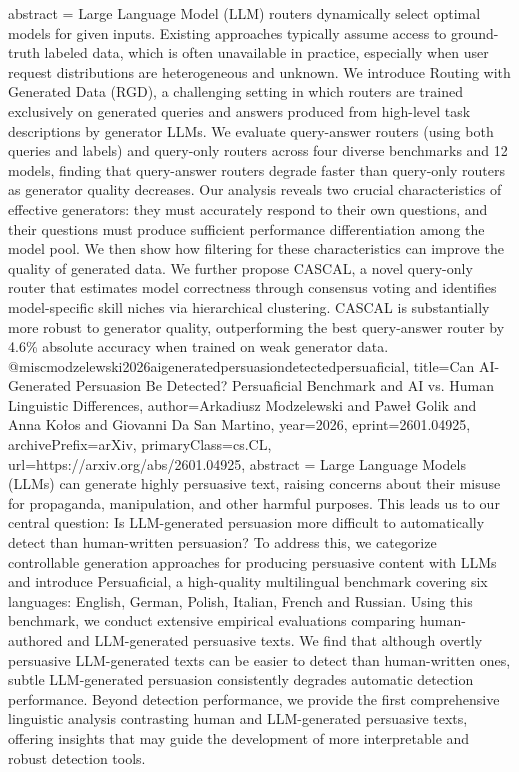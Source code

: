 {      abstract = {Large Language Model (LLM) routers dynamically select optimal models for given inputs. Existing approaches typically assume access to ground-truth labeled data, which is often unavailable in practice, especially when user request distributions are heterogeneous and unknown. We introduce Routing with Generated Data (RGD), a challenging setting in which routers are trained exclusively on generated queries and answers produced from high-level task descriptions by generator LLMs. We evaluate query-answer routers (using both queries and labels) and query-only routers across four diverse benchmarks and 12 models, finding that query-answer routers degrade faster than query-only routers as generator quality decreases. Our analysis reveals two crucial characteristics of effective generators: they must accurately respond to their own questions, and their questions must produce sufficient performance differentiation among the model pool. We then show how filtering for these characteristics can improve the quality of generated data. We further propose CASCAL, a novel query-only router that estimates model correctness through consensus voting and identifies model-specific skill niches via hierarchical clustering. CASCAL is substantially more robust to generator quality, outperforming the best query-answer router by 4.6\% absolute accuracy when trained on weak generator data.}
}@misc{modzelewski2026aigeneratedpersuasiondetectedpersuaficial,
      title={Can AI-Generated Persuasion Be Detected? Persuaficial Benchmark and AI vs. Human Linguistic Differences}, 
      author={Arkadiusz Modzelewski and Paweł Golik and Anna Kołos and Giovanni Da San Martino},
      year={2026},
      eprint={2601.04925},
      archivePrefix={arXiv},
      primaryClass={cs.CL},
      url={https://arxiv.org/abs/2601.04925},
      abstract = {Large Language Models (LLMs) can generate highly persuasive text, raising concerns about their misuse for propaganda, manipulation, and other harmful purposes. This leads us to our central question: Is LLM-generated persuasion more difficult to automatically detect than human-written persuasion? To address this, we categorize controllable generation approaches for producing persuasive content with LLMs and introduce Persuaficial, a high-quality multilingual benchmark covering six languages: English, German, Polish, Italian, French and Russian. Using this benchmark, we conduct extensive empirical evaluations comparing human-authored and LLM-generated persuasive texts. We find that although overtly persuasive LLM-generated texts can be easier to detect than human-written ones, subtle LLM-generated persuasion consistently degrades automatic detection performance. Beyond detection performance, we provide the first comprehensive linguistic analysis contrasting human and LLM-generated persuasive texts, offering insights that may guide the development of more interpretable and robust detection tools.}
}
